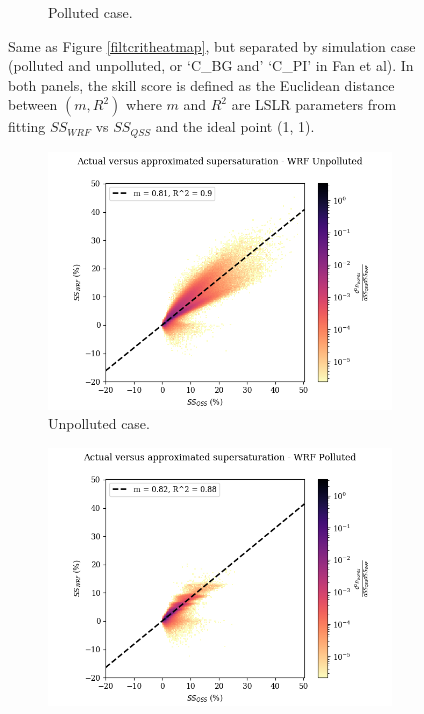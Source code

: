 \documentclass{article}
\begin{document}
\begin{figure}[ht]
\begin{subfigure}{0.7\textwidth}
		\caption{Polluted case.}
		\label{filtcritheatmapseppoll}
	\end{subfigure}
	\caption{Same as Figure \ref{filtcritheatmap}, but separated by simulation case (polluted and unpolluted, or `C\_BG and' `C\_PI' in Fan et al). In both panels, the skill score is defined as the Euclidean distance between $(m, R^2)$ where $m$ and $R^2$ are LSLR parameters from fitting $SS_{WRF}$ vs $SS_{QSS}$ and the ideal point (1, 1).}
	\label{filtcritheatmapsep}
\end{figure}

\begin{figure}[ht]
	\centering
	\begin{subfigure}{0.7\textwidth}
		\includegraphics[width=\textwidth]{wrf/heatmap_ss_qss_vs_ss_wrf_Unpolluted_figure.png}
		\caption{Unpolluted case.}
		\label{wrfvsqssunpoll}
	\end{subfigure}
	\begin{subfigure}{0.7\textwidth}
		\includegraphics[width=\textwidth]{wrf/heatmap_ss_qss_vs_ss_wrf_Polluted_figure.png}

\end{subfigure}
\end{figure}
\end{document}
